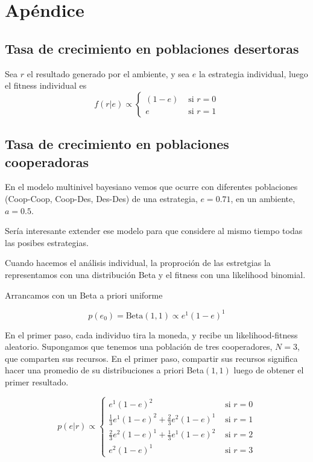 \documentclass[a4paper,10pt]{article}
\begin{document}
\section{Apéndice}



\subsection{Tasa de crecimiento en poblaciones desertoras}

Sea $r$ el resultado generado por el ambiente, y sea $e$ la estrategia individual, luego el fitness individual es
\begin{equation}
f(r|e) \propto 
\begin{cases}
(1-e) & \text{ si } r = 0 \\
e & \text{ si } r = 1
\end{cases}
\end{equation}



\subsection{Tasa de crecimiento en poblaciones cooperadoras}

En el modelo multinivel bayesiano vemos que ocurre con diferentes  poblaciones (Coop-Coop, Coop-Des, Des-Des) de una estrategia, $e = 0.71$, en un ambiente, $a = 0.5$.

Sería interesante extender ese modelo para que considere al mismo tiempo todas las posibes estrategias.

Cuando hacemos el análisis individual, la proproción de las estretgias la representamos con una distribución Beta y el fitness con una likelihood binomial.

Arrancamos con un Beta a priori uniforme

\begin{equation}
p(e_0) = \text{Beta}(1,1) \propto e^1 (1-e)^1 
\end{equation}

En el primer paso, cada individuo tira la moneda, y recibe un likelihood-fitness aleatorio.
Supongamos que tenemos una población de tres cooperadores, $N=3$, que comparten sus recursos.
En el primer paso, compartir sus recursos significa hacer una promedio de su distribuciones a priori Beta$(1,1)$ luego de obtener el primer resultado.

\begin{equation}
p(e|r) \propto 
\begin{cases}
e^1 (1-e)^2 & \text{ si } r = 0 \\
\frac{1}{3} e^1 (1-e)^2 + \frac{2}{3} e^2 (1-e)^1  & \text{ si } r = 1 \\
\frac{2}{3} e^2 (1-e)^1 + \frac{1}{3} e^1 (1-e)^2    & \text{ si } r = 2 \\
e^2 (1-e)^1 & \text{ si } r = 3
\end{cases}
\end{equation}
\end{document}
